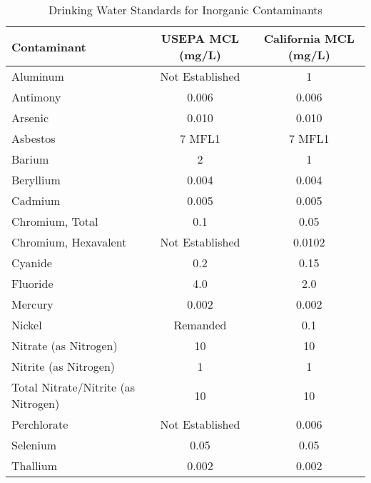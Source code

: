 \begin{table}[ht]
\begin{center}
\begin{tabular}{|l|c|c|}
\hline
Contaminant                               & USEPA   MCL  (mg/L) & California   MCL  (mg/L) \\
\hline
Aluminum                                  & Not   Established   & 1                        \\
\hline
Antimony                                  & 0.006               & 0.006                    \\
\hline
Arsenic                                   & 0.010               & 0.010                    \\
\hline
Asbestos                                  & 7 MFL1              & 7 MFL1                   \\
\hline
Barium                                    & 2                   & 1                        \\
\hline
Beryllium                                 & 0.004               & 0.004                    \\
\hline
Cadmium                                   & 0.005               & 0.005                    \\
\hline
Chromium,   Total                         & 0.1                 & 0.05                     \\
\hline
Chromium,   Hexavalent                    & Not   Established   & 0.0102                   \\
\hline
Cyanide                                   & 0.2                 & 0.15                     \\
\hline
Fluoride                                  & 4.0                 & 2.0                      \\
\hline
Mercury                                   & 0.002               & 0.002                    \\
\hline
Nickel                                    & Remanded            & 0.1                      \\
\hline
Nitrate   (as   Nitrogen)                 & 10                  & 10                       \\
\hline
Nitrite   (as   Nitrogen)                 & 1                   & 1                        \\
\hline
Total   Nitrate/Nitrite   (as   Nitrogen) & 10                  & 10                       \\
\hline
Perchlorate                               & Not   Established   & 0.006                    \\
\hline
Selenium                                  & 0.05                & 0.05                     \\
\hline
Thallium                                  & 0.002               & 0.002                   \\
\hline
\end{tabular}
\caption{Drinking Water Standards for Inorganic Contaminants}
\end{center}
\end{table}

